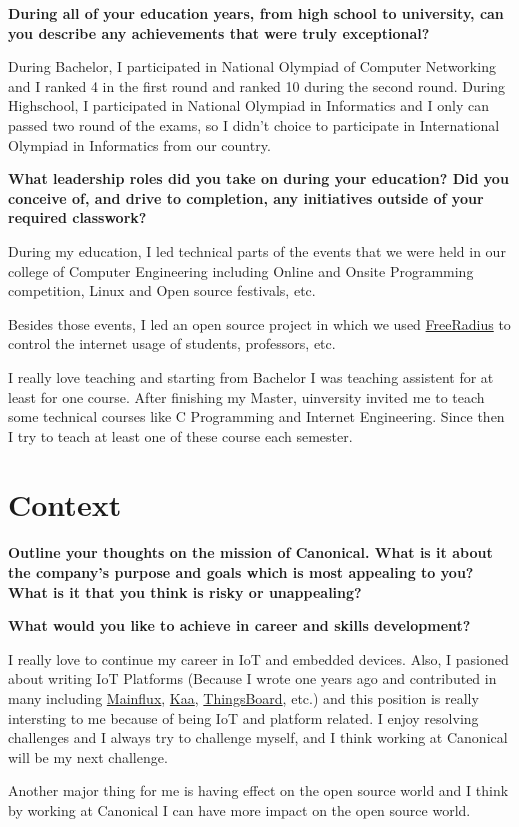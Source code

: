 \noindent
\textbf{During all of your education years, from high school to university, can you describe any achievements that were truly exceptional?}

During Bachelor, I participated in National Olympiad of Computer Networking and I ranked 4 in the first round and ranked
10 during the second round.
During Highschool, I participated in National Olympiad in Informatics and I only can passed two round of the exams, so
I didn't choice to participate in International Olympiad in Informatics from our country.

\noindent
\textbf{What leadership roles did you take on during your education?
Did you conceive of, and drive to completion, any initiatives outside of your required classwork?}

During my education, I led technical parts of the events that we were held in our college of Computer Engineering including
Online and Onsite Programming competition, Linux and Open source festivals, etc.

Besides those events, I led an open source project in which we used \href{https://freeradius.org/}{FreeRadius}
to control the internet usage of students, professors, etc.

I really love teaching and starting from Bachelor I was teaching assistent for at least for one course.
After finishing my Master, uinversity invited me to teach some technical courses like C Programming and
Internet Engineering. Since then I try to teach at least one of these course each semester.

\section{Context}

\noindent
\textbf{Outline your thoughts on the mission of Canonical. What is it about the company's purpose and goals which is most appealing to you?
What is it that you think is risky or unappealing?}

\noindent
\textbf{What would you like to achieve in career and skills development?}

I really love to continue my career in IoT and embedded devices. Also, I pasioned about writing IoT Platforms
(Because I wrote one years ago and contributed in many including \href{https://github.com/mainflux}{Mainflux},
\href{https://github.com/kaaproject}{Kaa}, \href{https://github.com/thingsboard}{ThingsBoard}, etc.)
and this position is really intersting to me because of being IoT and platform related.
I enjoy resolving challenges and I always try to challenge myself, and I think working at Canonical will be my next challenge.

Another major thing for me is having effect on the open source world and I think by working at Canonical I can
have more impact on the open source world.
